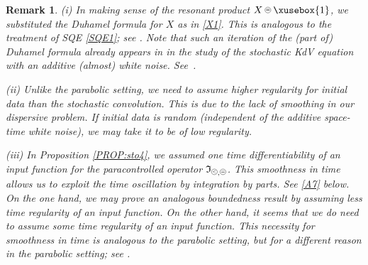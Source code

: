 \documentclass[%
11pt,  reqno]{amsart}
\def\<#1>{\xusebox{#1}}
\newcommand{\pe}{\mathbin{\scaleobj{0.7}{\tikz \draw (0,0) node[shape=circle,draw,inner sep=0pt,minimum size=8.5pt] {\scriptsize  $=$};}}}
\newcommand{\pl}{\mathbin{\scaleobj{0.7}{\tikz \draw (0,0) node[shape=circle,draw,inner sep=0pt,minimum size=8.5pt] {\scriptsize $<$};}}}
\newtheorem{remark}[theorem]{Remark}
\newcommand{\1}{\hspace{0.2mm}\text{I}\hspace{0.2mm}}
\newcommand{\noi}{\noindent}
\newcommand{\If}{\mathfrak{I}}
\numberwithin{equation}{section}
\numberwithin{theorem}{section}
\begin{document}
\begin{remark}
\rm

(i) 
In making sense of the resonant product $X\pe \<1>$, 
we substituted the Duhamel formula
for $X$ as in \eqref{X1}.
This is analogous to the treatment of SQE \eqref{SQE1}; see \cite{MW1}.
Note that 
such an iteration of the (part of) Duhamel formula
already appears in  in the study of the stochastic KdV equation 
with an additive (almost) white noise.
See~\cite{Gub12, Oh}.


\smallskip

\noi
(ii) 
Unlike the parabolic setting, we need to assume higher regularity for initial data
than the stochastic convolution.
This is due to the lack of smoothing in our dispersive problem.
If initial data is random (independent of the additive space-time white noise), we may take it to be of low regularity.


\smallskip

\noi
(iii) In Proposition \ref{PROP:sto4}, 
we assumed one time differentiability
of an input function for the paracontrolled operator
$\If_{\pl, \pe}$. 
This smoothness in time allows us to exploit the time oscillation
by integration by parts.  See \eqref{A7} below.
On the one hand, we may prove an analogous
boundedness result by assuming less time regularity of an input function.
On the other hand, it seems that 
we do need to assume some time regularity of an input function.
This necessity for smoothness in time is analogous to the parabolic setting,
but for a different reason in the parabolic setting; see \cite{Hairer, CC, MW1}.

%
%


\end{remark}
\end{document}
